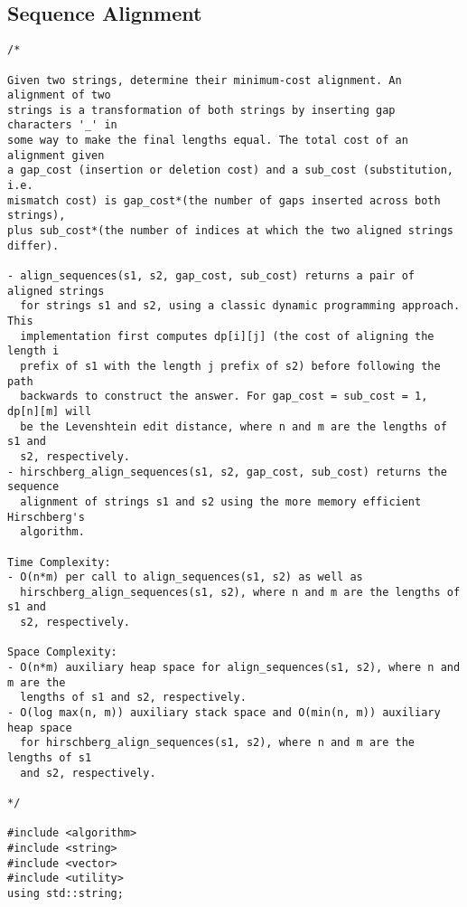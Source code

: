 \subsection{Sequence Alignment}
\begin{lstlisting}
/*

Given two strings, determine their minimum-cost alignment. An alignment of two
strings is a transformation of both strings by inserting gap characters '_' in
some way to make the final lengths equal. The total cost of an alignment given
a gap_cost (insertion or deletion cost) and a sub_cost (substitution, i.e.
mismatch cost) is gap_cost*(the number of gaps inserted across both strings),
plus sub_cost*(the number of indices at which the two aligned strings differ).

- align_sequences(s1, s2, gap_cost, sub_cost) returns a pair of aligned strings
  for strings s1 and s2, using a classic dynamic programming approach. This
  implementation first computes dp[i][j] (the cost of aligning the length i
  prefix of s1 with the length j prefix of s2) before following the path
  backwards to construct the answer. For gap_cost = sub_cost = 1, dp[n][m] will
  be the Levenshtein edit distance, where n and m are the lengths of s1 and
  s2, respectively.
- hirschberg_align_sequences(s1, s2, gap_cost, sub_cost) returns the sequence
  alignment of strings s1 and s2 using the more memory efficient Hirschberg's
  algorithm.

Time Complexity:
- O(n*m) per call to align_sequences(s1, s2) as well as
  hirschberg_align_sequences(s1, s2), where n and m are the lengths of s1 and
  s2, respectively.

Space Complexity:
- O(n*m) auxiliary heap space for align_sequences(s1, s2), where n and m are the
  lengths of s1 and s2, respectively.
- O(log max(n, m)) auxiliary stack space and O(min(n, m)) auxiliary heap space
  for hirschberg_align_sequences(s1, s2), where n and m are the lengths of s1
  and s2, respectively.

*/

#include <algorithm>
#include <string>
#include <vector>
#include <utility>
using std::string;


\end{lstlisting}
